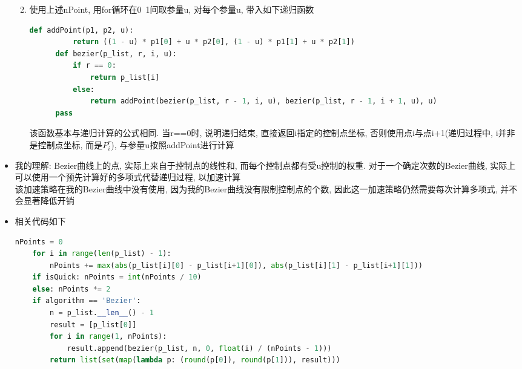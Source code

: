 \documentclass[a4paper,UTF8]{article}
\theoremstyle{definition}
\begin{document}
\begin{itemize}
\begin{enumerate}
\begin{enumerate}
    \end{enumerate}
    \item 使用上述nPoint, 用for循环在0~1间取参量u, 对每个参量u, 带入如下递归函数\begin{lstlisting}[language={Python}]
      def addPoint(p1, p2, u): 
          return ((1 - u) * p1[0] + u * p2[0], (1 - u) * p1[1] + u * p2[1])
      def bezier(p_list, r, i, u):
          if r == 0:
              return p_list[i]
          else:
              return addPoint(bezier(p_list, r - 1, i, u), bezier(p_list, r - 1, i + 1, u), u)
      pass
    \end{lstlisting}
    该函数基本与递归计算的公式相同. 当r==0时, 说明递归结束, 直接返回i指定的控制点坐标, 否则使用点i与点i+1(递归过程中, i并非是控制点坐标, 而是$P_{i}^r$), 与参量u按照addPoint进行计算
  \end{enumerate}
  \item 我的理解: Bezier曲线上的点, 实际上来自于控制点的线性和, 而每个控制点都有受u控制的权重. 对于一个确定次数的Bezier曲线, 实际上可以使用一个预先计算好的多项式代替递归过程, 以加速计算\\
  该加速策略在我的Bezier曲线中没有使用, 因为我的Bezier曲线没有限制控制点的个数, 因此这一加速策略仍然需要每次计算多项式, 并不会显著降低开销
  \item 相关代码如下
  \begin{lstlisting}[language={Python}]
    nPoints = 0
    for i in range(len(p_list) - 1):
        nPoints += max(abs(p_list[i][0] - p_list[i+1][0]), abs(p_list[i][1] - p_list[i+1][1]))
    if isQuick: nPoints = int(nPoints / 10)
    else: nPoints *= 2
    if algorithm == 'Bezier':
        n = p_list.__len__() - 1
        result = [p_list[0]]
        for i in range(1, nPoints):
            result.append(bezier(p_list, n, 0, float(i) / (nPoints - 1)))
        return list(set(map(lambda p: (round(p[0]), round(p[1])), result)))
\end{lstlisting}
\end{itemize}
\end{document}
